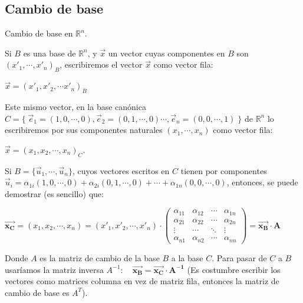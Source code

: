 \subsection{Cambio de base}
\label{matriz-cambio-base}

\begin{teor}{Cambio de base en $\mathbb R^n$}.

Si $B$ es una base de $\mathbb R^n$, y $\vec x$ un vector cuyas componentes en $B$ son $(x'_1,\cdots ,x'_n)_B$, escribiremos el vector  $\vec x$  como vector fila:

 $\vec x =\left( x'_1, x'_2, \cdots x'_n \right)_B $ 
 
 Este mismo vector, en la base canónica $C=\{\; \vec e_1=(1,0,\cdots ,0),\vec e_2=(0,1,\cdots, 0) \cdots , \vec e_n=(0,0,\cdots ,1)\; \}$ de $\mathbb R^n$ lo escribiremos  por sus componentes naturales $(x_1,\cdots ,x_n)$ como vector fila:
 
  $\vec x =\left( x_1, x_2, \cdots , x_n \right)_C $.
  
  Si $B=\{\vec u_1, \cdots , \vec u_n\}$, cuyos vectores escritos en $C$ tienen por componentes $\vec u_i=\alpha_{1i} (1,0,\cdots ,0) + \alpha_{2i}(0,1,\cdots, 0)+ \cdots + \alpha_{1n}(0,0,\cdots ,0)$, entonces, se puede demostrar \textcolor{gris}{(es sencillo)} que:
  
 \noindent  \small{$\boldsymbol{\vec {x_C}} = (x_1, x_2, \cdots, x_n) = (x'_1, x'_2, \cdots , x'_n) \cdot\left( \begin{matrix} 
  \alpha_{11} & \alpha_{12}&\cdots & \alpha_{1n} \\
  \alpha_{21} & \alpha_{22}& \cdots & \alpha_{2n} \\
  \vdots & \cdots &\ddots & \vdots \\
  \alpha_{n1} & \alpha_{n2}& \cdots & \alpha_{nn}
  \end{matrix} \right) =\boldsymbol{ \vec {x_B} \cdot A }$} 

\normalsize{Donde} $A$ es la matriz de cambio de la base $B$ a la base $C$. Para pasar de $C$ a $B$ usaríamos la matriz inversa $A^{-1}: \quad \boldsymbol{\vec{x_B}=\vec {x_C}\cdot A^{-1} }$ (Es costumbre escribir los vectores como matrices columna en vez de matriz fila, entonces la matriz de cambio de base es $A^T$).
  
\end{teor}

